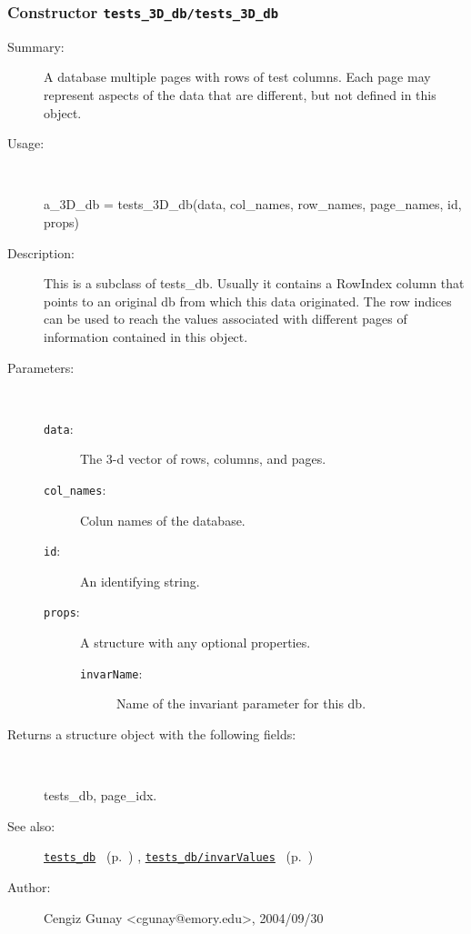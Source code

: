 \subsubsection[Constructor \texttt{tests\_3D\_db}]{Constructor \texttt{tests\_3D\_db/tests\_3D\_db}}%
%
\label{ref_tests_3D_db__tests_3D_db}%
\hypertarget{ref_tests_3D_db__tests_3D_db}{}%
\begin{description}
\item[Summary:]A database multiple pages with rows of test columns. 
		Each page may represent aspects of the data that are
		different, but not defined in this object.
%
\item[Usage:]~%
\begin{lyxcode}%
a\_3D\_db = tests\_3D\_db(data, col\_names, row\_names, page\_names, id, props)
%
\end{lyxcode}%
%
\item[Description:]%
This is a subclass of tests\_db. Usually it contains a RowIndex
 column that points to an original db from which this data originated. 
 The row indices can be used to reach the values associated with different
 pages of information contained in this object.
\item[Parameters:]~
\begin{description}%
\item[\texttt{data}:]
 The 3-d vector of rows, columns, and pages.
\item[\texttt{col\_names}:]
 Colun names of the database.
\item[\texttt{id}:]
 An identifying string.
\item[\texttt{props}:]
 A structure with any optional properties.
\begin{description}%
\item[\texttt{invarName}:]
 Name of the invariant parameter for this db.
\end{description}%
\end{description}%
%
\item[Returns a structure object with the following fields:
]~

	tests\_db, page\_idx.
%
%
\item[See also:]%
\hyperlink{ref_tests_db}{\texttt{tests\_db}}%
\ (p.~\pageref{ref_tests_db})%
%
, \hyperlink{ref_tests_db__invarValues}{\texttt{tests\_db/invarValues}}%
\ (p.~\pageref{ref_tests_db__invarValues})%
%
%
\item[Author:]%
Cengiz Gunay <cgunay@emory.edu>, 2004/09/30
%
\end{description}
\methodline%
